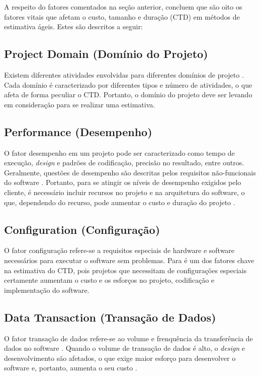 A respeito do fatores comentados na seção anterior,  concluem que são oito os fatores vitais que afetam o 
custo, tamanho e duração (CTD) em métodos de estimativa ágeis. Estes são descritos a seguir:

\subsection{Project Domain (Domínio do Projeto)}
  
  Existem diferentes atividades envolvidas para diferentes domínios de projeto \cite{jones07}. Cada domínio é caracterizado por
  diferentes tipos e número de atividades, o que afeta de forma peculiar o CTD. Portanto, o domínio do projeto deve ser levando em consideração para
  se realizar uma estimativa.

\subsection{Performance (Desempenho)}
 
  O fator desempenho em um projeto pode ser caracterizado como tempo de execução, \textit{design} e padrões de codificação, precisão
  no resultado, entre outros. Geralmente, questões de desempenho são descritas pelos requisitos não-funcionais do software \cite{bhalerao09}.
  Portanto, para se atingir os níveis de desempenho exigidos pelo cliente, é necessário incluir recursos no projeto e na arquitetura
  do software, o que, dependendo do recurso, pode aumentar o custo e duração do projeto \cite{bhalerao09}.
  
\subsection{Configuration (Configuração)}
 
  O fator configuração refere-se a requisitos especiais de hardware e software necessários para executar o software sem problemas.
  Para  é um dos fatores chave na estimativa do CTD, pois projetos que necessitam de configurações especiais
  certamente aumentam o custo e os esforços no projeto, codificação e implementação do software.
  
\subsection{Data Transaction (Transação de Dados)}
 
 O fator transação de dados refere-se ao volume e frenquência da transferência de dados no software \cite{bhalerao09}. Quando o volume
 de transação de dados é alto, o \textit{design} e desenvolvimento são afetados, o que exige maior esforço para desenvolver o software
 e, portanto, aumenta o seu custo \cite{bhalerao09}.
   
